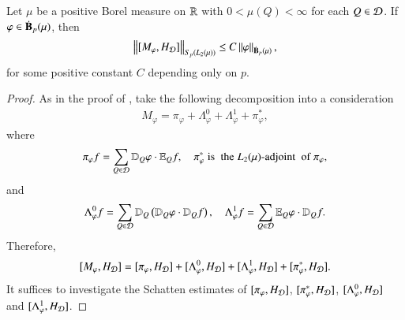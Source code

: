 \documentclass[leqno]{amsart}
\begin{document}
\begin{proposition}\label{commutator Sp estimate}
Let $\mu$ be a positive Borel measure on ${\mathbb R}$ with $0<\mu(Q)<\infty$ for each $Q\in{\mathcal D}$.  If $\varphi\in\dot{\mathbf B}_{p}(\mu)$, then 
\begin{align*}
\left\| [M_{\varphi},H_{{\mathcal D}}] \right\|_{S_{p}(L_{2}(\mu))}
\leq C\left\| \varphi \right\|_{\dot{\mathbf B}_{p}(\mu)},
\end{align*}
for some positive constant $C$ depending only on $p$.
\end{proposition}
\begin{proof}
As in the proof of , take the following decomposition into a consideration
\begin{align*}
M_{\varphi}=\pi_{\varphi}+\Lambda^{0}_{\varphi}+\Lambda^{1}_{\varphi}+\pi_{\varphi}^{*},
\end{align*}
where
\begin{align*}
\pi_{\varphi}f
=\sum_{Q\in{\mathcal D}}\mathbb{D}_{Q}\varphi\cdot \mathbb E_{Q}f,\quad
\pi_{\varphi}^{*}\; \mbox{is\; the}\; L_{2}(\mu)\mbox{-adjoint\; of}\; \pi_{\varphi},
\end{align*}
and
\begin{align*}
\Lambda^{0}_{\varphi}f
=\sum_{Q\in{\mathcal D}}\mathbb{D}_{Q}\left(\mathbb{D}_{Q}\varphi\cdot\mathbb{D}_{Q}f\right),\quad
\Lambda^{1}_{\varphi}f
=\sum_{Q\in{\mathcal D}}\mathbb E_{Q}\varphi\cdot\mathbb{D}_{Q}f.
\end{align*}
Therefore,
$$[M_{\varphi},H_{{\mathcal D}}]=[\pi_{\varphi},H_{{\mathcal D}}]+[\Lambda^{0}_{\varphi},H_{{\mathcal D}}]
+[\Lambda^{1}_{\varphi},H_{{\mathcal D}}]+[\pi_{\varphi}^{*},H_{{\mathcal D}}].$$ 
It suffices to investigate the Schatten estimates of $[\pi_{\varphi},H_{{\mathcal D}}]$, $[\pi_{\varphi}^{*},H_{{\mathcal D}}]$, $[\Lambda^{0}_{\varphi},H_{{\mathcal D}}]$ and $[\Lambda^{1}_{\varphi},H_{{\mathcal D}}]$.


\end{proof}
\end{document}
